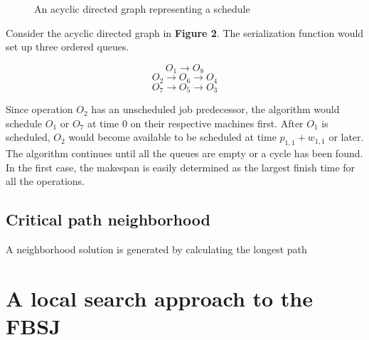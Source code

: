 \documentclass[a4paper,12pt]{article}
\begin{document}
\begin{figure}
\centering
{}
\caption{An acyclic directed graph representing a schedule}
\end{figure}

Consider the acyclic directed graph in \textbf{Figure 2}. The serialization function would set up three ordered queues.

\[ O_1 \rightarrow O_8 \]
\[ O_2 \rightarrow O_6 \rightarrow O_4 \]
\[ O_7 \rightarrow O_5 \rightarrow O_3 \]

Since operation $O_2$ has an unscheduled job predecessor, the algorithm would schedule $O_1$ or $O_7$ at time 0 on their respective machines first. After $O_1$ is scheduled, $O_2$ would become available to be scheduled at time $p_{1,1} + w_{1,1}$ or later. The algorithm continues until all the queues are empty or a cycle has been found. In the first case, the makespan is easily determined as the largest finish time for all the operations.

\subsection{Critical path neighborhood}

A neighborhood solution is generated by calculating the longest path 

\section{A local search approach to the FBSJ}
\end{document}
